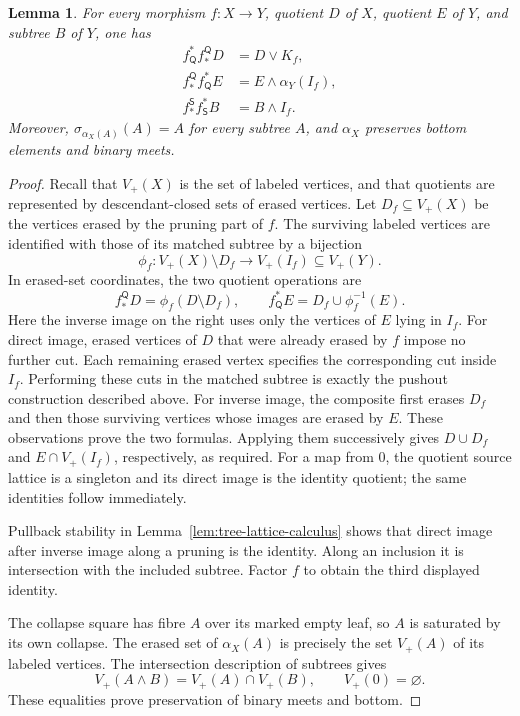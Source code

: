 \documentclass[11pt,a4paper]{article}
\theoremstyle{plain}
\newtheorem{lemma}[theorem]{Lemma}
\theoremstyle{definition}
\theoremstyle{remark}
\begin{document}
\begin{lemma}\label{lem:tree-form-identities}
For every morphism $f:X\to Y$, quotient $D$ of $X$, quotient
$E$ of $Y$, and subtree $B$ of $Y$, one has
\[
 \begin{split}
 f_{\mathsf Q}^*f_*^{\mathsf Q}D&=D\vee K_f,\\
 f_*^{\mathsf Q}f_{\mathsf Q}^*E&=E\wedge\alpha_Y(I_f),\\
 f_*^{\mathsf S}f_{\mathsf S}^*B&=B\wedge I_f.
 \end{split}
\]
Moreover, $\sigma_{\alpha_X(A)}(A)=A$ for every subtree $A$,
and $\alpha_X$ preserves bottom elements and binary meets.
\end{lemma}
\begin{proof}
Recall that $V_+(X)$ is the set of labeled vertices, and that
quotients are represented by descendant-closed sets of erased
vertices. Let $D_f\subseteq V_+(X)$ be the vertices erased
by the pruning part of $f$.
The surviving labeled vertices are identified with those of its
matched subtree by a bijection
\[
 \phi_f:V_+(X)\setminus D_f\longrightarrow V_+(I_f)
 \subseteq V_+(Y).
\]
In erased-set coordinates, the two quotient operations are
\[
 f_*^{\mathsf Q}D=\phi_f(D\setminus D_f),\qquad
 f_{\mathsf Q}^*E=D_f\cup\phi_f^{-1}(E).
\]
Here the inverse image on the right uses only the vertices of
$E$ lying in $I_f$. For direct image, erased vertices of $D$
that were already erased by $f$ impose no further cut. Each
remaining erased vertex specifies the corresponding cut inside
$I_f$. Performing these cuts in the matched subtree is exactly
the pushout construction described above. For inverse
image, the composite first erases $D_f$ and then those surviving
vertices whose images are erased by $E$. These observations
prove the two formulas. Applying them successively gives
$D\cup D_f$ and $E\cap V_+(I_f)$, respectively, as required.
For a map from $0$, the quotient source lattice is a singleton
and its direct image is the identity quotient; the same
identities follow immediately.

Pullback stability in Lemma~\ref{lem:tree-lattice-calculus}
shows that direct image after inverse image along a pruning is
the identity. Along an inclusion it is intersection with the
included subtree. Factor $f$ to obtain the third displayed
identity.

The collapse square has fibre $A$ over its marked empty leaf,
so $A$ is saturated by its own collapse. The erased set of
$\alpha_X(A)$ is precisely the set $V_+(A)$ of its labeled
vertices. The intersection description of subtrees gives
\[
 V_+(A\wedge B)=V_+(A)\cap V_+(B),\qquad V_+(0)=\varnothing.
\]
These equalities prove preservation of binary meets and bottom.
\end{proof}
\end{document}
